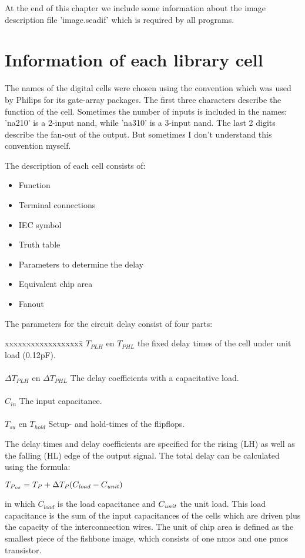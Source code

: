 At the end of this chapter we include some information about the
image description file 'image.seadif' which is required by all
 programs.

\section{Information of each library cell}

The names of the digital cells were chosen using the convention
which was used by Philips for its gate-array packages. The first
three characters describe the function of the cell. Sometimes the
number of inputs is included in the names: 'na210' is a 2-input
nand, while 'na310' is a 3-input nand. The last 2 digits describe
the fan-out of the output. But sometimes I don't understand this
convention myself.

The description of each cell consists of:
\begin{itemize}
\item
Function 
\item
Terminal connections
\item
IEC symbol
\item
Truth table
\item
Parameters to determine the delay
\item
Equivalent chip area
\item
Fanout
\end{itemize}

The parameters for the circuit delay consist of four parts:
\begin{tabbing}
xxxxxxxxxxxxxxxxxx\=\kill
$T_{PLH}$ en $T_{PHL}$\> the fixed delay times of the cell under
unit load (0.12pF).\\
\\
${\Delta}T_{PLH}$ en ${\Delta}T_{PHL}$\> The delay coefficients with a
capacitative load.\\
\\
$C_{in}$\> The input capacitance.\\
\\
$T_{su}$ en $T_{hold}$\> Setup- and hold-times of the flipflops.
\end{tabbing}

The delay times and delay coefficients are specified for the
rising (LH) as well as the falling (HL) edge of the output signal.
The total delay can be calculated using the formula:
\begin{description}
\item
$T_{\it P_{tot}} = T_{\it P} + \Delta T_{\it P}(C_{\it load}-C_{\it unit})$
\end{description}
in which $C_{load}$ is the load capacitance and $C_{\it unit}$ the
unit load. This load capacitance
is the sum of the input capacitances of the cells which are driven
plus the capacity of the interconnection wires.  The unit of chip
area is defined as the smallest piece of the fishbone image, which
consists of one nmos and one pmos transistor.
\clearpage

